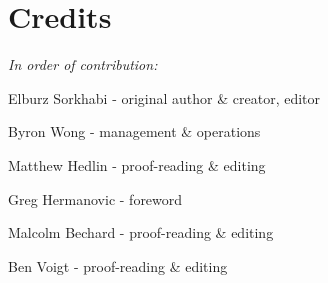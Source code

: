\cleardoublepage
\chapter{Credits}
\label{ch:14}


\begin{fullwidth}

\textit{In order of contribution:}

Elburz Sorkhabi - original author \& creator, editor

Byron Wong - management \& operations

Matthew Hedlin - proof-reading \& editing

Greg Hermanovic - foreword

Malcolm Bechard - proof-reading \& editing

Ben Voigt - proof-reading \& editing

\end{fullwidth}

